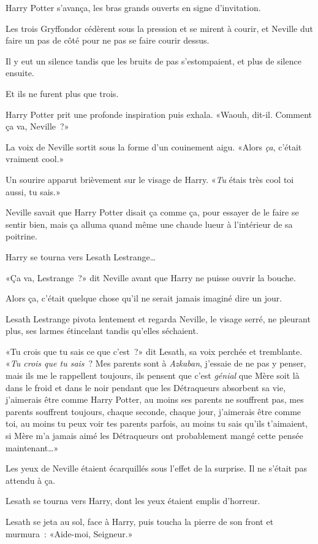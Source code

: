 Harry Potter s'avança, les bras grands ouverts en signe d'invitation.

Les trois Gryffondor cédèrent sous la pression et se mirent à courir, et Neville dut faire un pas de côté pour ne pas se faire courir dessus.

Il y eut un silence tandis que les bruits de pas s'estompaient, et plus de silence ensuite.

Et ils ne furent plus que trois.

Harry Potter prit une profonde inspiration puis exhala. «Waouh, dit-il. Comment ça va, Neville~?»

La voix de Neville sortit sous la forme d'un couinement aigu. «Alors \emph{ça}, c'était vraiment cool.»

Un sourire apparut brièvement sur le visage de Harry. «\emph{Tu} étais très cool toi aussi, tu sais.»

Neville savait que Harry Potter disait ça comme ça, pour essayer de le faire se sentir bien, mais ça alluma quand même une chaude lueur à l'intérieur de sa poitrine.

Harry se tourna vers Lesath Lestrange…

«Ça va, Lestrange~?» dit Neville avant que Harry ne puisse ouvrir la bouche.

Alors ça, c'était quelque chose qu'il ne serait jamais imaginé dire un jour.

Lesath Lestrange pivota lentement et regarda Neville, le visage serré, ne pleurant plus, ses larmes étincelant tandis qu'elles séchaient.

«Tu crois que tu sais ce que c'est~?» dit Lesath, sa voix perchée et tremblante. «\emph{Tu crois que tu sais}~? Mes parents sont à \emph{Azkaban}, j'essaie de ne pas y penser, mais ils me le rappellent toujours, ils pensent que c'est \emph{génial} que Mère soit là dans le froid et dans le noir pendant que les Détraqueurs absorbent sa vie, j'aimerais être comme Harry Potter, au moins ses parents ne souffrent pas, mes parents souffrent toujours, chaque seconde, chaque jour, j'aimerais être comme toi, au moins tu peux voir tes parents parfois, au moins tu sais qu'ils t'aimaient, si Mère m'a jamais aimé les Détraqueurs ont probablement mangé cette pensée maintenant…»

Les yeux de Neville étaient écarquillés sous l'effet de la surprise. Il ne s'était pas attendu à ça.

Lesath se tourna vers Harry, dont les yeux étaient emplis d'horreur.

Lesath se jeta au sol, face à Harry, puis toucha la pierre de son front et murmura~: «Aide-moi, Seigneur.»

